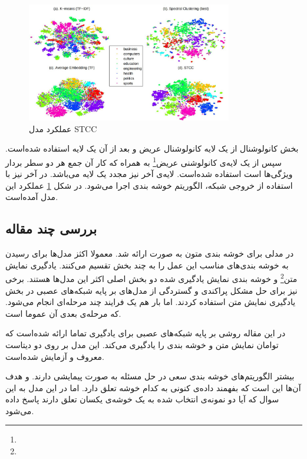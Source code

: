 \documentclass[12pt, a4paper, oneside]{report}
\begin{document}
\begin{figure}[!ht]
    \centering
    \includegraphics[width=0.8\textwidth]{STCC}
    \caption{عملکرد مدل STCC}
    \label{fig:STCC}
\end{figure}

بخش کانولوشنال از یک لایه کانولوشنال عریض و بعد از آن یک لایه
استفاده شده‌است. سپس از یک لایه‌ی کانولوشنی عریض\footnote{}
به همراه
که کار آن جمع هر دو سطر بردار ویژگی‌ها است  استفاده شده‌است. لایه‌ی آخر نیز مجدد یک لایه 
می‌باشد. در آخر نیز با استفاده از خروجی شبکه، الگوریتم خوشه بندی
اجرا می‌شود. در شکل
\ref{fig:STCC}
عملکرد این مدل آمده‌است.

\subsection{بررسی چند مقاله}
در
\cite{zhou2019endtoend}
مدلی برای خوشه بندی متون به صورت
ارائه شد. معمولا اکثز مدل‌ها برای رسیدن به خوشه بندی‌های مناسب این عمل را به چند بخش تقسیم می‌کنند.
یادگیری نمایش متن\footnote{}
و خوشه بندی نمایش یادگیری شده دو بخش اصلی اکثر این مدل‌ها هستند. برخی نیز برای حل مشکل
پراکندی و گستردگی از مدل‌های بر پایه شبکه‌های عصبی در بخش یادگیری نمایش متن استفاده کردند.
اما بار هم یک فرایند چند مرحله‌ای انجام می‌شود. که مرحله‌ی بعدی آن عموما
است.

در این مقاله روشی بر پایه شبکه‌های عصبی برای یادگیری تماما
ارائه شده‌است که توامان نمایش متن و خوشه بندی را یادگیری می‌کند. این مدل بر روی دو دیتاست معروف
و
آزمایش شده‌است.

بیشتر الگوریتم‌های خوشه بندی سعی در حل مسئله به صورت پیمایشی دارند. و هدف آن‌ها این است که بفهمند
داده‌ی کنونی به کدام خوشه تعلق دارد. اما در این مدل به این سوال که آیا دو نمونه‌ی انتخاب شده به یک
خوشه‌ی یکسان تعلق دارند پاسخ داده می‌شود.
\end{document}
